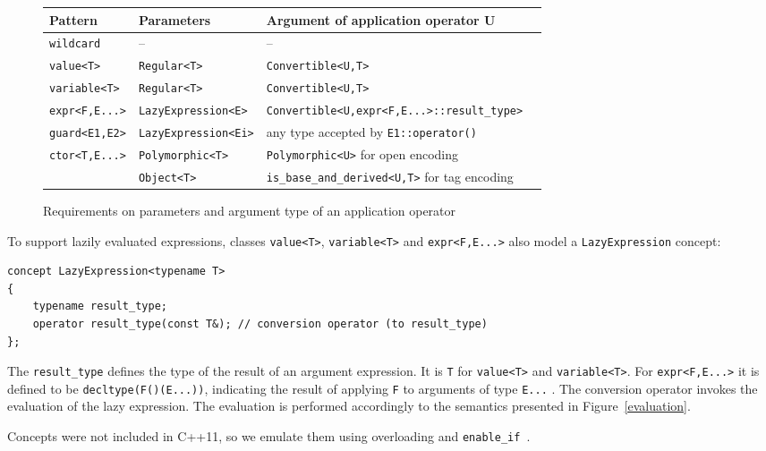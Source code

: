 \documentclass{llncs}
\makeatletter
\DeclareRobustCommand{\code}[1]{{\lstinline[keepspaces,breaklines=false,escapechar=@]{#1}}}
\makeatother
\begin{document}
\begin{figure}[h]
\centering
\begin{tabular}{llll}
{\bf Pattern}       & {\bf Parameters}          & {\bf Argument of application operator U}         \\ \hline
\code{wildcard}     & --                        & --                                               \\
\code{value<T>}     & \code{Regular<T>}         & \code{Convertible<U,T>}                          \\
\code{variable<T>}  & \code{Regular<T>}         & \code{Convertible<U,T>}                          \\
\code{expr<F,E...>} & \code{LazyExpression<E>}  & \code{Convertible<U,expr<F,E...>::result_type>}  \\
\code{guard<E1,E2>} & \code{LazyExpression<Ei>} & any type accepted by \code{E1::operator()}       \\
\code{ctor<T,E...>} & \code{Polymorphic<T>}     & \code{Polymorphic<U>} for open encoding          \\
                    & \code{Object<T>}          & \code{is_base_and_derived<U,T>} for tag encoding \\
\end{tabular}
\caption{Requirements on parameters and argument type of an application operator}
\label{xt-reqs}
\end{figure}

To support lazily evaluated expressions, classes \code{value<T>}, 
\code{variable<T>} and \code{expr<F,E...>} also model a \code{LazyExpression} 
concept:

\begin{lstlisting}[keepspaces,columns=flexible]
concept LazyExpression<typename T> 
{
    typename result_type;
    operator result_type(const T&); // conversion operator (to result_type)
};
\end{lstlisting}

\noindent
The \code{result_type} defines the type of the result of an argument expression.
It is \code{T} for \code{value<T>} and \code{variable<T>}. 
For \code{expr<F,E...>} it is defined to be \code{decltype(F()(E...))}, 
indicating the result of applying \code{F} to arguments of type 
\code{E...} .
The conversion operator invokes the evaluation of the 
lazy expression. The evaluation is performed accordingly to the semantics 
presented in Figure~\ref{evaluation}.

Concepts were not included in C++11, so we emulate them using overloading and 
\code{enable_if}~\cite{jarvi:03:cuj_arbitrary_overloading}.
\end{document}
